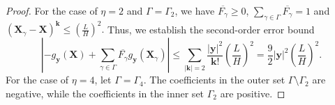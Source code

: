 \documentclass[review,onefignum,onetabnum]{siamart250211}
\begin{document}
\begin{proof}
For the case of \( \eta = 2 \) and \( \Gamma =\Gamma_2 \), we have \( \overline{F_{\gamma}} \geq 0 \), \( \sum_{\gamma \in \Gamma} \overline{F_{\gamma}} = 1 \) and
\(
(\mathbf{X}_\gamma - \mathbf{X})^{\mathbf{k}} \leq \left( \frac{L}{H} \right)^2.
\)
Thus, we establish the second-order error bound
\begin{equation}
    \left|-g_\mathbf{y}(\mathbf{X}) + \sum_{\gamma \in \Gamma} \overline{F_{\gamma}} g_\mathbf{y}(\mathbf{X}_\gamma)\right| \leq \sum_{|\mathbf{k}| = 2} \frac{|\mathbf{y}|^2}{\mathbf{k}!} \left( \frac{L}{H} \right)^2 = \frac{9}{2} |\mathbf{y}|^2 \left( \frac{L}{H} \right)^2.
    \label{eq:PIC2}
\end{equation}
For the case of \( \eta = 4 \), let \(\Gamma = \Gamma_4\). The coefficients in the outer set \( \Gamma \setminus \Gamma_2 \) are negative, while the coefficients in the inner set \( \Gamma_2 \) are positive.


\end{proof}
\end{document}
